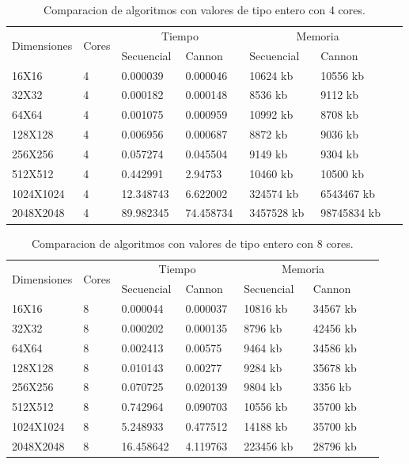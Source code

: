 \documentclass[12pt]{article}
\begin{document}
\begin{titlepage}
\begin{table}[!htb]
\centering
  \begin{tabular}{|l|l|l|l|l|l|l|}
    \hline
    \multirow{2}{*}{Dimensiones} &
    \multirow{2}{*}{Cores} &
      \multicolumn{2}{c|}{Tiempo} &
      \multicolumn{2}{c|}{Memoria}\\
     
    &  &Secuencial & Cannon & Secuencial & Cannon\\
    \hline
    16X16 & 4\ & 0.000039\ & 0.000046\ & 10624 kb\ & 10556 kb\ \\
    \hline
    32X32 & 4\ & 0.000182\ & 0.000148\ & 8536 kb\ & 9112 kb\ \\
    \hline
    64X64 & 4\ & 0.001075\ & 0.000959\ & 10992 kb\ & 8708 kb\ \\
    \hline
    128X128 & 4\ & 0.006956\ & 0.000687\ & 8872 kb\ & 9036 kb\ \\
    \hline
    256X256 & 4\ & 0.057274\ & 0.045504\ & 9149 kb\ & 9304 kb\ \\
    \hline
    512X512 & 4\ & 0.442991\ & 2.94753\ & 10460 kb\ & 10500 kb\ \\
    \hline
    1024X1024 & 4\ & 12.348743\ & 6.622002\ & 324574 kb\ & 6543467 kb\ \\
    \hline
    2048X2048 & 4\ & 89.982345\ & 74.458734\ & 3457528 kb\ & 98745834 kb\ \\
    \hline
  \end{tabular}
  \hfill
    \caption{Comparacion de algoritmos con valores de tipo entero con 4 cores.}
\end{table}
\begin{table}[!htb]
\centering
  \begin{tabular}{|l|l|l|l|l|l|l|}
    \hline
    \multirow{2}{*}{Dimensiones} &
    \multirow{2}{*}{Cores} &
      \multicolumn{2}{c|}{Tiempo} &
      \multicolumn{2}{c|}{Memoria}\\
     
    &  &Secuencial & Cannon & Secuencial & Cannon\\
    \hline
    16X16 & 8\ & 0.000044\ & 0.000037\ & 10816 kb\ & 34567 kb\ \\
    \hline
    32X32 & 8\ & 0.000202\ & 0.000135\ & 8796 kb\ & 42456 kb\ \\
    \hline
    64X64 & 8\ & 0.002413\ & 0.00575\ & 9464 kb\ & 34586 kb\ \\
    \hline
    128X128 & 8\ & 0.010143\ & 0.00277\ & 9284 kb\ & 35678 kb\ \\
    \hline
    256X256 & 8\ & 0.070725\ & 0.020139\ & 9804 kb\ & 3356 kb\ \\
    \hline
    512X512 & 8\ & 0.742964\ & 0.090703\ & 10556 kb\ & 35700 kb\ \\
    \hline
    1024X1024 & 8\ & 5.248933\ & 0.477512\ & 14188 kb\ & 35700 kb\ \\
    \hline
    2048X2048 & 8\ & 16.458642\ & 4.119763\ &223456 kb \ & 28796 kb\ \\
    \hline
  \end{tabular}
  \hfill
    \caption{Comparacion de algoritmos con valores de tipo entero con 8 cores.}
\end{table}


\end{titlepage}
\end{document}

